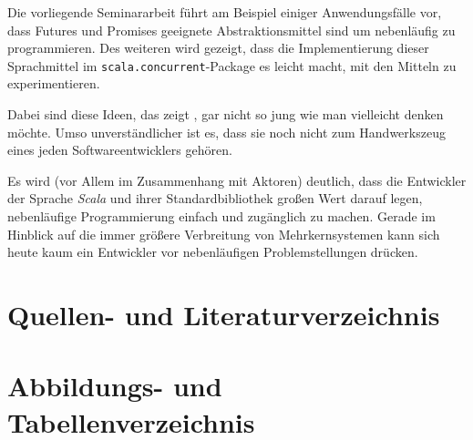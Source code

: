 \documentclass[11pt,a4paper,titlepage,ngerman]{scrartcl}
\begin{document}
Die vorliegende Seminararbeit führt am Beispiel einiger Anwendungsfälle vor,
dass Futures und Promises geeignete Abstraktionsmittel sind um nebenläufig
zu programmieren. Des weiteren wird gezeigt, dass die Implementierung dieser
Sprachmittel im \texttt{scala.concurrent}-Package es leicht macht, mit den
Mitteln zu experimentieren.

Dabei sind diese Ideen, das zeigt \cite{Baker:1977:IGC:872734.806932}, gar nicht
so jung wie man vielleicht denken möchte. Umso unverständlicher ist es, dass
sie noch nicht zum Handwerkszeug eines jeden Softwareentwicklers gehören.

Es wird (vor Allem im Zusammenhang mit Aktoren) deutlich, dass die Entwickler
der Sprache \emph{Scala} und ihrer Standardbibliothek großen Wert darauf legen,
nebenläufige Programmierung einfach und zugänglich zu machen. Gerade im Hinblick
auf die immer größere Verbreitung von Mehrkernsystemen kann sich heute kaum ein
Entwickler vor nebenläufigen Problemstellungen drücken.

\newpage

\section{Quellen- und Literaturverzeichnis}




\section{Abbildungs- und Tabellenverzeichnis}

\renewcommand{\listfigurename}{Verzeichnis der Abbildungen}
\listoffigures

\newpage

\printglossary
\end{document}
